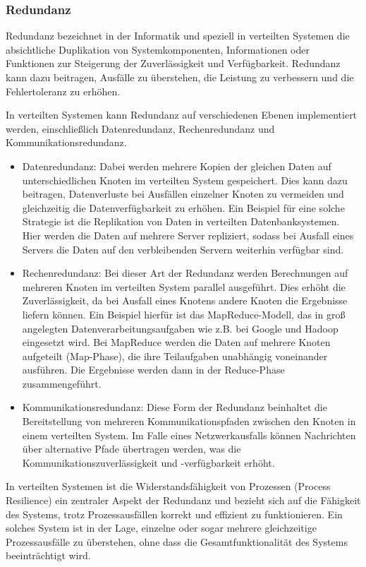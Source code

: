 \documentclass[../vs-script-first-v01.tex]{subfiles}
\begin{document}
\subsubsection{Redundanz}
Redundanz bezeichnet in der Informatik und speziell in verteilten Systemen die absichtliche Duplikation von Systemkomponenten, Informationen oder Funktionen zur Steigerung der Zuverlässigkeit und Verfügbarkeit. Redundanz kann dazu beitragen, Ausfälle zu überstehen, die Leistung zu verbessern und die Fehlertoleranz zu erhöhen.

In verteilten Systemen kann Redundanz auf verschiedenen Ebenen implementiert werden, einschließlich Datenredundanz, Rechenredundanz und Kommunikationsredundanz.
\begin{itemize}
\item Datenredundanz: Dabei werden mehrere Kopien der gleichen Daten auf unterschiedlichen Knoten im verteilten System gespeichert. Dies kann dazu beitragen, Datenverluste bei Ausfällen einzelner Knoten zu vermeiden und gleichzeitig die Datenverfügbarkeit zu erhöhen. Ein Beispiel für eine solche Strategie ist die Replikation von Daten in verteilten Datenbanksystemen. Hier werden die Daten auf mehrere Server repliziert, sodass bei Ausfall eines Servers die Daten auf den verbleibenden Servern weiterhin verfügbar sind.
\item Rechenredundanz: Bei dieser Art der Redundanz werden Berechnungen auf mehreren Knoten im verteilten System parallel ausgeführt. Dies erhöht die Zuverlässigkeit, da bei Ausfall eines Knotens andere Knoten die Ergebnisse liefern können. Ein Beispiel hierfür ist das MapReduce-Modell, das in groß angelegten Datenverarbeitungsaufgaben wie z.B. bei Google und Hadoop eingesetzt wird. Bei MapReduce werden die Daten auf mehrere Knoten aufgeteilt (Map-Phase), die ihre Teilaufgaben unabhängig voneinander ausführen. Die Ergebnisse werden dann in der Reduce-Phase zusammengeführt.
\item Kommunikationsredundanz: Diese Form der Redundanz beinhaltet die Bereitstellung von mehreren Kommunikationspfaden zwischen den Knoten in einem verteilten System. Im Falle eines Netzwerkausfalls können Nachrichten über alternative Pfade übertragen werden, was die Kommunikationszuverlässigkeit und -verfügbarkeit erhöht.
\end{itemize}
In verteilten Systemen ist die Widerstandsfähigkeit von Prozessen (Process Resilience) ein zentraler Aspekt der Redundanz und bezieht sich auf die Fähigkeit des Systems, trotz Prozessausfällen korrekt und effizient zu funktionieren. Ein solches System ist in der Lage, einzelne oder sogar mehrere gleichzeitige Prozessausfälle zu überstehen, ohne dass die Gesamtfunktionalität des Systems beeinträchtigt wird.
\end{document}
